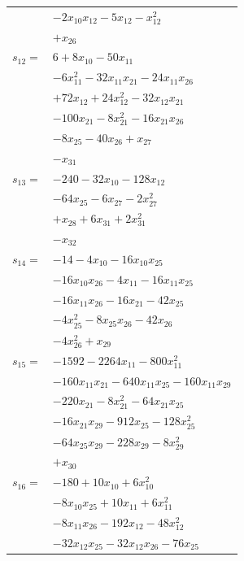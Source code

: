 \begin{longtable}{@{}r@{\;}l@{}}
 & \(\displaystyle -2x_{10}x_{12} -5x_{12} -x_{12}^{2}\) \\
 & \(\displaystyle +x_{26}\) \\[3pt]
\(s_{12}=\) & \(\displaystyle 6 +8x_{10} -50x_{11}\) \\
 & \(\displaystyle -6x_{11}^{2} -32x_{11}x_{21} -24x_{11}x_{26}\) \\
 & \(\displaystyle +72x_{12} +24x_{12}^{2} -32x_{12}x_{21}\) \\
 & \(\displaystyle -100x_{21} -8x_{21}^{2} -16x_{21}x_{26}\) \\
 & \(\displaystyle -8x_{25} -40x_{26} +x_{27}\) \\
 & \(\displaystyle -x_{31}\) \\[3pt]
\(s_{13}=\) & \(\displaystyle -240 -32x_{10} -128x_{12}\) \\
 & \(\displaystyle -64x_{25} -6x_{27} -2x_{27}^{2}\) \\
 & \(\displaystyle +x_{28} +6x_{31} +2x_{31}^{2}\) \\
 & \(\displaystyle -x_{32}\) \\[3pt]
\(s_{14}=\) & \(\displaystyle -14 -4x_{10} -16x_{10}x_{25}\) \\
 & \(\displaystyle -16x_{10}x_{26} -4x_{11} -16x_{11}x_{25}\) \\
 & \(\displaystyle -16x_{11}x_{26} -16x_{21} -42x_{25}\) \\
 & \(\displaystyle -4x_{25}^{2} -8x_{25}x_{26} -42x_{26}\) \\
 & \(\displaystyle -4x_{26}^{2} +x_{29}\) \\[3pt]
\(s_{15}=\) & \(\displaystyle -1592 -2264x_{11} -800x_{11}^{2}\) \\
 & \(\displaystyle -160x_{11}x_{21} -640x_{11}x_{25} -160x_{11}x_{29}\) \\
 & \(\displaystyle -220x_{21} -8x_{21}^{2} -64x_{21}x_{25}\) \\
 & \(\displaystyle -16x_{21}x_{29} -912x_{25} -128x_{25}^{2}\) \\
 & \(\displaystyle -64x_{25}x_{29} -228x_{29} -8x_{29}^{2}\) \\
 & \(\displaystyle +x_{30}\) \\[3pt]
\(s_{16}=\) & \(\displaystyle -180 +10x_{10} +6x_{10}^{2}\) \\
 & \(\displaystyle -8x_{10}x_{25} +10x_{11} +6x_{11}^{2}\) \\
 & \(\displaystyle -8x_{11}x_{26} -192x_{12} -48x_{12}^{2}\) \\
 & \(\displaystyle -32x_{12}x_{25} -32x_{12}x_{26} -76x_{25}\) \\

\end{longtable}
